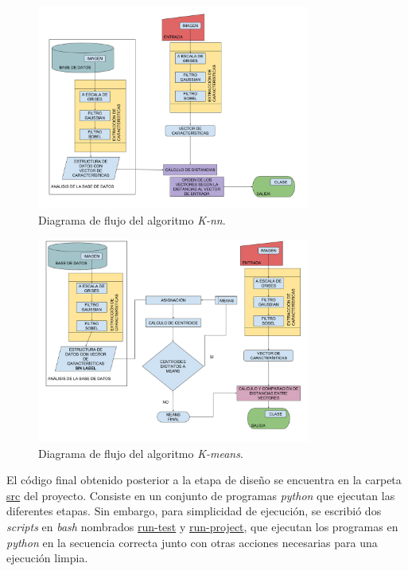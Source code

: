 \documentclass[10pt,a4paper]{article}
\begin{document}
\begin{figure}[h]
\centering
\includegraphics[width=0.8\textwidth]{imgs/flujo-knn.png}
\caption{Diagrama de flujo del algoritmo \textit{K-nn}.}
\label{flujo-knn}
\end{figure}

\begin{figure}[h]
\centering
\includegraphics[width=0.8\textwidth]{imgs/flujo-kmeans.png}
\caption{Diagrama de flujo del algoritmo \textit{K-means}.}
\label{flujo-kmeans}
\end{figure}

El código final obtenido posterior a la etapa de diseño se encuentra en la carpeta \href{./src/}{src} del proyecto. Consiste en un conjunto de programas \textit{python} que ejecutan las diferentes etapas. Sin embargo, para simplicidad de ejecución, se escribió dos \textit{scripts} en \textit{bash} nombrados \href{./run-test}{run-test} y \href{./run-project}{run-project}, que ejecutan los programas en \textit{python} en la secuencia correcta junto con otras acciones necesarias para una ejecución limpia.
\end{document}

